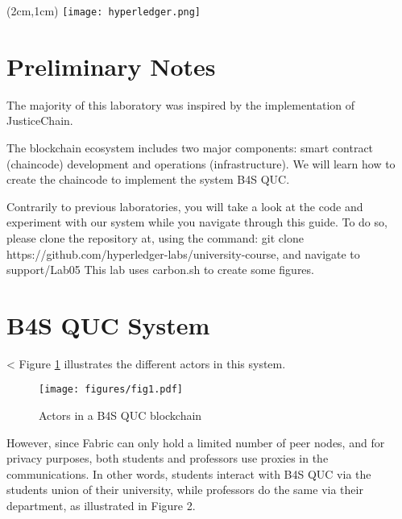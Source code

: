 \documentclass[12pt,a4paper]{article}
\theoremstyle{definition}
\begin{document}
    \textblockorigin{-34pt}{-12pt}
    \begin{textblock*}{10cm}(2cm,1cm)
    \texttt{[image: hyperledger.png]}
    \end{textblock*}
    \newtheorem{mydef}{Definition}

    \section*{Preliminary Notes}


    The majority of this laboratory was inspired by the implementation of JusticeChain\cite{belchior2019_audits}.



    The blockchain ecosystem includes two major components: smart contract (chaincode) development and operations (infrastructure). We will learn how to create the chaincode to implement the system B4S QUC.

    Contrarily to previous laboratories, you will take a look at the code and experiment with our system while you navigate through this guide.
    To do so, please clone the repository at, using the command:
    {git clone https://github.com/hyperledger-labs/university-course}, and navigate to support/Lab05
    This lab uses carbon.sh to create some figures.




    \section{ B4S QUC System}
    <
    Figure \ref{fig:actors} illustrates the different actors in this system.

    \begin{figure}[h]
        \centering
        \texttt{[image: figures/fig1.pdf]}
        \caption{Actors in a B4S QUC blockchain}
        \label{fig:actors}
    \end{figure}


    However, since Fabric can only hold a limited number of peer nodes, and for privacy purposes, both students and professors use proxies in the communications. In other words, students interact with B4S QUC via the students union of their university, while professors
    do the same via their department, as illustrated in Figure 2.
\end{document}
